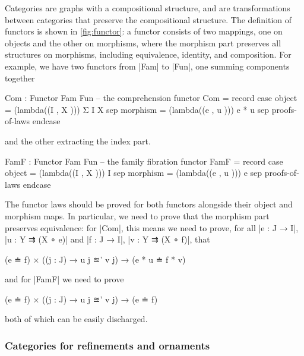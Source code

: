 Categories are graphs with a compositional structure, and  are transformations between categories that preserve the compositional structure.
The definition of functors is shown in \autoref{fig:functor}: a functor consists of two mappings, one on objects and the other on morphisms, where the morphism part preserves all structures on morphisms, including equivalence, identity, and composition.
For example, we have two functors from |Fam| to |Fun|, one summing components together
\begin{code}
Com : Functor Fam Fun  -- the comprehension functor
Com = record  case  object    =  (lambda((I  ,  X  )))  Σ I X
              sep   morphism  =  (lambda((e  ,  u  )))  e * u
              sep   proofs-of-laws endcase
\end{code}
and the other extracting the index part.
\begin{code}
FamF : Functor Fam Fun  -- the family fibration functor
FamF = record  case  object    =  (lambda((I  ,  X  )))  I
               sep   morphism  =  (lambda((e  ,  u  )))  e
               sep   proofs-of-laws endcase
\end{code}
The functor laws should be proved for both functors alongside their object and morphism maps.
In particular, we need to prove that the morphism part preserves equivalence: for |Com|, this means we need to prove, for all |e : J → I|, |u : Y ⇉ (X ∘ e)| and |f : J → I|, |v : Y ⇉ (X ∘ f)|, that
\begin{code}
(e ≐ f) × ((j : J) → u {j} ≊' v {j}) → (e * u ≐ f * v)
\end{code}
and for |FamF| we need to prove
\begin{code}
(e ≐ f) × ((j : J) → u {j} ≊' v {j}) → (e ≐ f)
\end{code}
both of which can be easily discharged.

\subsubsection{Categories for refinements and ornaments}

